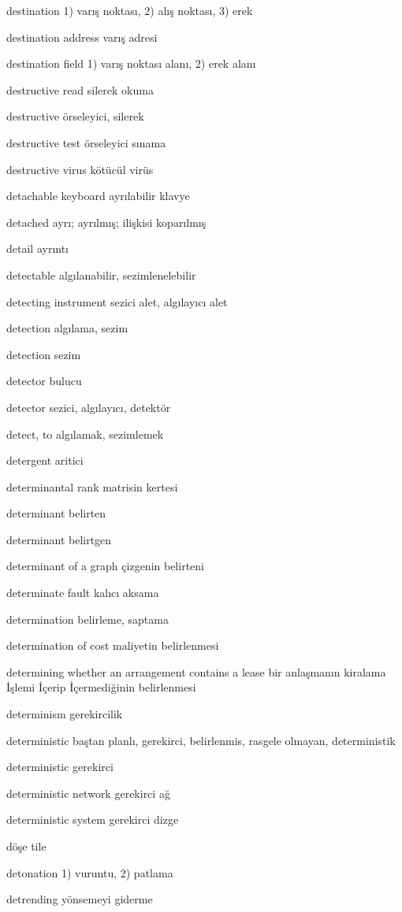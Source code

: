 \documentclass[12pt,fleqn]{article}\usepackage{../../common}
\begin{document}
destination 1) varış noktası, 2) alış noktası, 3) erek

destination address varış adresi

destination field 1) varış noktası alanı, 2) erek alanı

destructive read silerek okuma

destructive örseleyici, silerek

destructive test örseleyici sınama

destructive virus kötücül virüs

detachable keyboard ayrılabilir klavye

detached ayrı; ayrılmış; ilişkisi koparılmış

detail ayrıntı

detectable algılanabilir, sezimlenelebilir

detecting instrument sezici alet, algılayıcı alet

detection algılama, sezim

detection sezim

detector bulucu

detector sezici, algılayıcı, detektör

detect, to algılamak, sezimlemek

detergent aritici

determinantal rank matrisin kertesi

determinant belirten

determinant belirtgen

determinant of a graph çizgenin belirteni

determinate fault kalıcı aksama

determination belirleme, saptama

determination of cost maliyetin belirlenmesi

determining whether an arrangement contains a lease bir anlaşmanın kiralama İşlemi İçerip İçermediğinin belirlenmesi

determinism gerekircilik

deterministic baştan planlı, gerekirci, belirlenmis, rasgele olmayan, deterministik

deterministic gerekirci

deterministic network gerekirci ağ

deterministic system gerekirci dizge

döşe tile

detonation 1) vuruntu, 2) patlama

detrending yönsemeyi giderme
\end{document}

